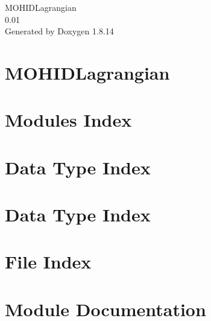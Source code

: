 \documentclass[twoside]{book}
\newcommand{\+}{\discretionary{\mbox{\scriptsize$\hookleftarrow$}}{}{}}
\newcommand{\clearemptydoublepage}{%
  \newpage{\pagestyle{empty}\cleardoublepage}%
}
\begin{document}
\hypersetup{pageanchor=false,
             bookmarksnumbered=true,
             pdfencoding=unicode
            }
\begin{titlepage}
\vspace*{7cm}
\begin{center}%
{\Large M\+O\+H\+I\+D\+Lagrangian \\[1ex]\large 0.\+01 }\\
\vspace*{1cm}
{\large Generated by Doxygen 1.8.14}\\
\end{center}
\end{titlepage}
\clearemptydoublepage
{}
\tableofcontents
\clearemptydoublepage
{}
\hypersetup{pageanchor=true}

\chapter{M\+O\+H\+I\+D\+Lagrangian}
\label{index}\hypertarget{index}{}
\chapter{Modules Index}

\chapter{Data Type Index}

\chapter{Data Type Index}

\chapter{File Index}

\chapter{Module Documentation}
























\end{document}
